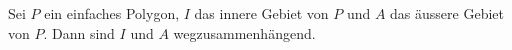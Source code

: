 \begin{lemma}   
        Sei $P$ ein einfaches Polygon, $I$ das innere Gebiet von $P$ und $A$ das äussere Gebiet von $P$. 
        Dann sind $I$ und $A$ wegzusammenhängend.
\end{lemma}